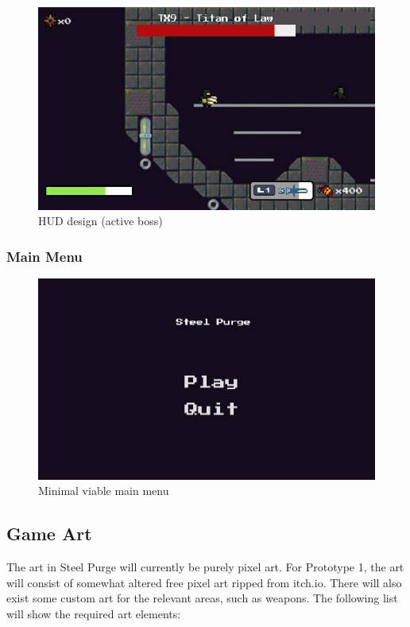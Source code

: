\documentclass[../Main.tex]{subfiles}
\begin{document}
\begin{figure}[H]
	\centering
	\includegraphics[width=\columnwidth]{Figures/HUDBoss.png}
	\caption{HUD design (active boss)}
\end{figure}

\subsubsection{Main Menu}

\begin{figure}[H]
	\centering
	\includegraphics[width=\columnwidth]{Figures/StartMenu.png}
	\caption{Minimal viable main menu}
\end{figure}

\subsection{Game Art}

The art in Steel Purge will currently be purely pixel art. For Prototype 1, the art will consist of somewhat altered free pixel art ripped from itch.io. There will also exist some custom art for the relevant areas, such as weapons. The following list will show the required art elements:
\end{document}
